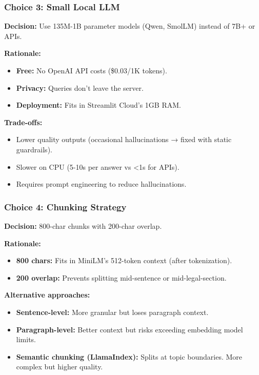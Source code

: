 \documentclass[11pt,a4paper]{article}
\begin{document}
\subsubsection{Choice 3: Small Local LLM}

\textbf{Decision:} Use 135M-1B parameter models (Qwen, SmolLM) instead of 7B+ or APIs.

\textbf{Rationale:}
\begin{itemize}
\item \textbf{Free:} No OpenAI API costs (\$0.03/1K tokens).
\item \textbf{Privacy:} Queries don't leave the server.
\item \textbf{Deployment:} Fits in Streamlit Cloud's 1GB RAM.
\end{itemize}

\textbf{Trade-offs:}
\begin{itemize}
\item Lower quality outputs (occasional hallucinations → fixed with static guardrails).
\item Slower on CPU (5-10s per answer vs <1s for APIs).
\item Requires prompt engineering to reduce hallucinations.
\end{itemize}

\subsubsection{Choice 4: Chunking Strategy}

\textbf{Decision:} 800-char chunks with 200-char overlap.

\textbf{Rationale:}
\begin{itemize}
\item \textbf{800 chars:} Fits in MiniLM's 512-token context (after tokenization).
\item \textbf{200 overlap:} Prevents splitting mid-sentence or mid-legal-section.
\end{itemize}

\textbf{Alternative approaches:}
\begin{itemize}
\item \textbf{Sentence-level:} More granular but loses paragraph context.
\item \textbf{Paragraph-level:} Better context but risks exceeding embedding model limits.
\item \textbf{Semantic chunking (LlamaIndex):} Splits at topic boundaries. More complex but higher quality.
\end{itemize}
\end{document}
